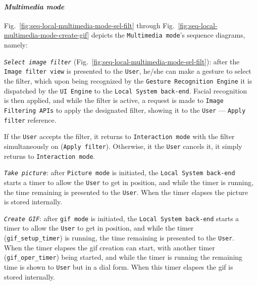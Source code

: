 \paragraph{\emph{Multimedia mode}}
Fig.~\ref{fig:seq-local-multimedia-mode-sel-filt} through
Fig.~\ref{fig:seq-local-multimedia-mode-create-gif} depicts the
\texttt{Multimedia mode}'s sequence diagrams, namely:
\begin{item-c}
\item \emph{\texttt{Select image filter}} (Fig.~\ref{fig:seq-local-multimedia-mode-sel-filt}): after the \texttt{Image
  filter view} is presented to the \texttt{User}, he/she can make a gesture to
select the filter, which upon being recognized by the \texttt{Gesture
  Recognition Engine} it is dispatched by the \texttt{UI Engine} to the
\texttt{Local System back-end}. Facial recognition is then applied, and while
the filter is active, a request is made to \texttt{Image Filtering APIs} to
apply the designated filter, showing it to the \texttt{User} --- \texttt{Apply
  filter} reference.

If the \texttt{User} accepts the filter, it returns to \texttt{Interaction mode}
with the filter simultaneously on (\texttt{Apply filter}). Otherwise, it the
\texttt{User} cancels it, it simply returns to \texttt{Interaction mode}.
% 
\item \emph{\texttt{Take picture}}: after \texttt{Picture mode} is initiated,
  the \texttt{Local System back-end} starts a timer to allow the \texttt{User}
  to get in position, and while the timer is running, the time remaining is
  presented to the \texttt{User}. When the timer elapses the picture is stored
  internally.
%
\item \emph{\texttt{Create GIF}}: after \texttt{\gls{gif} mode} is initiated,
  the \texttt{Local System back-end} starts a timer to allow the \texttt{User}
  to get in position, and while the timer (\texttt{gif\_setup\_timer}) is running, the time remaining is
  presented to the \texttt{User}. When the timer elapses the \gls{gif} creation
  can start, with another timer (\texttt{gif\_oper\_timer}) being started, and while the timer is running
  the remaining time is shown to \texttt{User} but in a dial form. When this
  timer elapses the \gls{gif} is stored internally.
\end{item-c}
%
